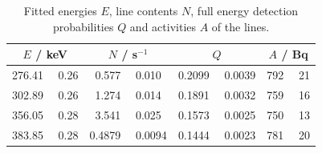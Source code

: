 \begin{table}[H]
	\centering
	\caption{Fitted energies $E$, line contents $N$, full energy detection probabilities $Q$ and activities $A$ of the  lines.}
	\label{tab:ba_activity}
	\begin{tabular}{c  c  c  c}
		\toprule
		$E$ / keV & $N$ / s$^{-1}$ & $Q$ & $A$ / Bq\\
		\midrule
		276.41  \, \clap{$\pm$} \,  0.26 & 0.577  \, \clap{$\pm$} \,  0.010 & 0.2099  \, \clap{$\pm$} \,  0.0039 & 792  \, \clap{$\pm$} \,  21 \\
		 302.89  \, \clap{$\pm$} \,  0.26 & 1.274  \, \clap{$\pm$} \,  0.014 & 0.1891  \, \clap{$\pm$} \,  0.0032 & 759  \, \clap{$\pm$} \,  16 \\
		 356.05  \, \clap{$\pm$} \,  0.28 & 3.541  \, \clap{$\pm$} \,  0.025 & 0.1573  \, \clap{$\pm$} \,  0.0025 & 750  \, \clap{$\pm$} \,  13 \\
		 383.85  \, \clap{$\pm$} \,  0.28 & 0.4879  \, \clap{$\pm$} \,  0.0094 & 0.1444  \, \clap{$\pm$} \,  0.0023 & 781  \, \clap{$\pm$} \,  20 \\
		 \bottomrule
	\end{tabular}
\end{table}
